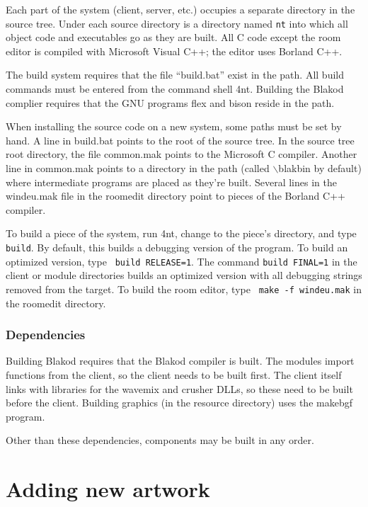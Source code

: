 Each part of the system (client, server, etc.) occupies a separate
directory in the source tree.  Under each source directory is a
directory named {\tt nt} into which all object code and executables go
as they are built.  All C code except the room editor is compiled with
Microsoft Visual C++; the editor uses Borland C++.

The build system requires that the file ``build.bat'' exist in the
path.  All build commands must be entered from the command shell 4nt.
Building the Blakod complier requires that the GNU programs flex and
bison reside in the path.  

When installing the source code on a new system, some paths must be
set by hand.  A line in build.bat points to the root of the source
tree.  In the source tree root directory, the file common.mak points
to the Microsoft C compiler.  Another line in common.mak points to a
directory in the path (called $\backslash$blakbin by default) where
intermediate programs are placed as they're built.  Several lines in
the windeu.mak file in the roomedit directory point to pieces of the
Borland C++ compiler.

To build a piece of the system, run 4nt, change to the piece's
directory, and type \texttt{build}.  By default, this builds a debugging
version of the program.  To build an optimized version, type {\tt
build RELEASE=1}.  The command {\tt build FINAL=1} in the client or
module directories builds an optimized version with all debugging
strings removed from the target.  To build the room editor, type {\tt
make -f windeu.mak} in the roomedit directory.

\subsubsection{Dependencies}

Building Blakod requires that the Blakod compiler is built.  The
modules import functions from the client, so the client needs to be
built first.  The client itself links with libraries for the wavemix
and crusher DLLs, so these need to be built before the client.
Building graphics (in the resource directory) uses the makebgf program.

Other than these dependencies, components may be built in any order.

\section{Adding new artwork}

